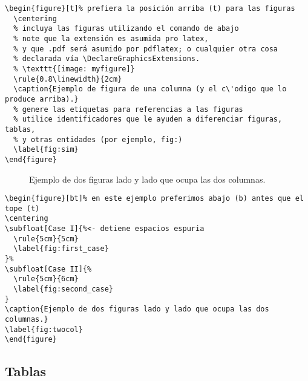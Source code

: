 \documentclass[twocolumn,11pts]{IEEEtran}
\begin{document}
\begin{lstlisting}[float=tb,caption={Código que produce la Figura~\ref{fig:sim}.},label=cod:sim]
\begin{figure}[t]% prefiera la posición arriba (t) para las figuras
  \centering
  % incluya las figuras utilizando el comando de abajo
  % note que la extensión es asumida pro latex,
  % y que .pdf será asumido por pdflatex; o cualquier otra cosa
  % declarada vía \DeclareGraphicsExtensions.
  % \texttt{[image: myfigure]}
  \rule{0.8\linewidth}{2cm}
  \caption{Ejemplo de figura de una columna (y el c\'odigo que lo produce arriba).}
  % genere las etiquetas para referencias a las figuras
  % utilice identificadores que le ayuden a diferenciar figuras, tablas,
  % y otras entidades (por ejemplo, fig:)
  \label{fig:sim}
\end{figure}
\end{lstlisting}


%
\begin{figure*}[bt]%
\centering
\subfloat[Case I]{%
  \rule{5cm}{5cm}
  \label{fig:first_case}
}%
\subfloat[Case II]{%
  \rule{5cm}{6cm}
  \label{fig:second_case}
}
\caption{Ejemplo de dos figuras lado y lado que ocupa las dos columnas.}
\label{fig:twocol}
\end{figure*}

\begin{lstlisting}[float=tb,caption={Código que produce la Figura~\ref{fig:twocol}.},label=cod:twocol]
\begin{figure*}[bt]% en este ejemplo preferimos abajo (b) antes que el tope (t)
\centering
\subfloat[Case I]{%<- detiene espacios espuria
  \rule{5cm}{5cm}
  \label{fig:first_case}
}%
\subfloat[Case II]{%
  \rule{5cm}{6cm}
  \label{fig:second_case}
}
\caption{Ejemplo de dos figuras lado y lado que ocupa las dos columnas.}
\label{fig:twocol}
\end{figure*}
\end{lstlisting}


\subsection{Tablas}
\end{document}
